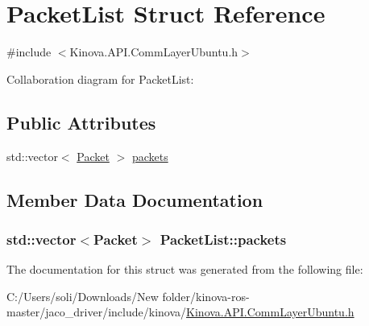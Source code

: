 \hypertarget{struct_packet_list}{}\section{Packet\+List Struct Reference}
\label{struct_packet_list}


{\ttfamily \#include $<$Kinova.\+A\+P\+I.\+Comm\+Layer\+Ubuntu.\+h$>$}



Collaboration diagram for Packet\+List\+:
\subsection*{Public Attributes}
\begin{DoxyCompactItemize}
\item 
std\+::vector$<$ \hyperlink{struct_packet}{Packet} $>$ \hyperlink{struct_packet_list_ab65d649c78c882976472908a781e256d}{packets}
\end{DoxyCompactItemize}


\subsection{Member Data Documentation}
\subsubsection[{\texorpdfstring{packets}{packets}}]{\setlength{\rightskip}{0pt plus 5cm}std\+::vector$<${\bf Packet}$>$ Packet\+List\+::packets}\hypertarget{struct_packet_list_ab65d649c78c882976472908a781e256d}{}\label{struct_packet_list_ab65d649c78c882976472908a781e256d}


The documentation for this struct was generated from the following file\+:\begin{DoxyCompactItemize}
\item 
C\+:/\+Users/soli/\+Downloads/\+New folder/kinova-\/ros-\/master/jaco\+\_\+driver/include/kinova/\hyperlink{_kinova_8_a_p_i_8_comm_layer_ubuntu_8h}{Kinova.\+A\+P\+I.\+Comm\+Layer\+Ubuntu.\+h}\end{DoxyCompactItemize}

